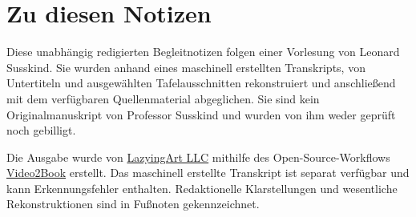 \documentclass[11pt,oneside]{book}
\begin{document}
\frontmatter
\hypersetup{pageanchor=false}

\hypersetup{pageanchor=true}

\clearpage
\chapter{Zu diesen Notizen}
Diese unabhängig redigierten Begleitnotizen folgen einer Vorlesung von Leonard
Susskind. Sie wurden anhand eines maschinell erstellten Transkripts, von
Untertiteln und ausgewählten Tafelausschnitten rekonstruiert und anschließend
mit dem verfügbaren Quellenmaterial abgeglichen. Sie sind kein Originalmanuskript
von Professor Susskind und wurden von ihm weder geprüft noch gebilligt.

Die Ausgabe wurde von \href{https://lazying.art}{LazyingArt LLC}
mithilfe des Open-Source-Workflows
\href{https://github.com/lachlanchen/Video2Book}{Video2Book} erstellt.
Das maschinell erstellte Transkript ist separat verfügbar und kann
Erkennungsfehler enthalten. Redaktionelle Klarstellungen und wesentliche
Rekonstruktionen sind in Fußnoten gekennzeichnet.
\clearpage
\tableofcontents
\mainmatter
\graphicspath{{../../../generated_course_notes/supplementary/higgs_boson/2012_summer/chapters/lecture_01/}{../../../generated_course_notes/supplementary/higgs_boson/2012_summer/figures/}{../../../generated_course_notes/supplementary/higgs_boson/2012_summer/assets/}}

\end{document}
